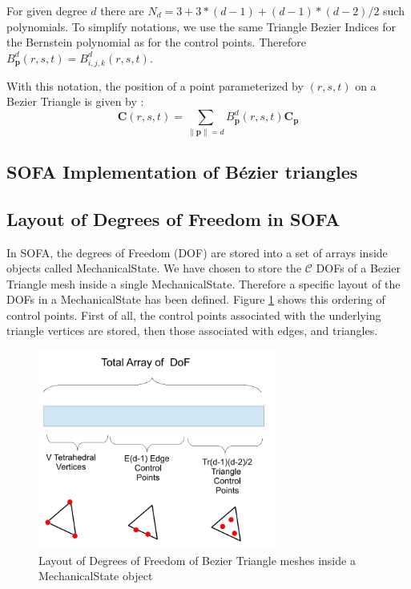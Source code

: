 \documentclass[a4paper,11pt]{article}
\newcommand{\Bezier}{{B{\'e}zier }}
\newcommand{\controls}{{\mathcal C}}
\newcommand{\control}{{\mathbf C}}
\newcommand{\degree}{{d}}
\begin{document}
For given degree $d$ there are $N_d=3+3*(\degree-1)+(\degree-1)*(\degree-2)/2$ such polynomials. To simplify notations, we use the same Triangle Bezier Indices for the Bernstein polynomial as for the control points. Therefore $B^d_{\mathbf p}(r,s,t)=B^d_{i,j,k}(r,s,t)$.

With this notation, the position of a point parameterized by $(r,s,t)$ on a Bezier Triangle is given by :
\[
\control(r,s,t)=\sum_{\|\mathbf p\|=\degree}  B^d_{\mathbf p}(r,s,t) \control_{\mathbf p}
\]

\subsection{SOFA Implementation of \Bezier triangles}

\subsection{Layout of Degrees of Freedom in SOFA}

In SOFA, the degrees of Freedom (DOF) are stored into a set of arrays inside objects called MechanicalState.
We have chosen to store the $\controls$ DOFs of a Bezier Triangle mesh inside a single MechanicalState. Therefore a specific layout  of the DOFs in a MechanicalState has been defined. 
Figure \ref{fig:LayoutBezierTriangle} shows this ordering of control points. First of all, the control points associated with the underlying triangle vertices are stored, then those associated with edges, and triangles.

\begin{figure}[!htbp]
	\centering
    \includegraphics[width=0.70\textwidth]{DofLayoutBezierTriangle}
	\caption{Layout of Degrees of Freedom of Bezier Triangle meshes inside a MechanicalState object}
	\label{fig:LayoutBezierTriangle}
\end{figure}
\end{document}
